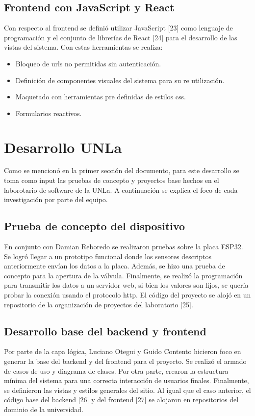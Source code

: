\subsection{Frontend con JavaScript y React}
Con respecto al frontend se definió utilizar JavaScript [23] como lenguaje de programación y el conjunto de librerías de React [24] para el desarrollo de las vistas del sistema. Con estas herramientas se realiza:
\begin{itemize}
\item Bloqueo de urls no permitidas sin autenticación.
\item Definición de componentes visuales del sistema para su re utilización.
\item Maquetado con herramientas pre definidas de estilos css.
\item Formularios reactivos.
\end{itemize}


\section{Desarrollo UNLa}
Como se mencionó en la primer sección del documento, para este desarrollo se toma como input las pruebas de concepto y proyectos base hechos en el laborotario de software de la UNLa. A continuación se explica el foco de cada investigación por parte del equipo.

\subsection{Prueba de concepto del dispositivo}
En conjunto con Damian Reboredo se realizaron pruebas sobre la placa ESP32. Se logró llegar a un prototipo funcional donde los sensores descriptos anteriormente envían los datos a la placa. Además, se hizo una prueba de concepto para la apertura de la válvula. Finalmente, se realizó la programación para transmitir los datos a un servidor web, si bien los valores son fijos, se quería probar la conexión usando el protocolo http. El código del proyecto se alojó en un repositorio de la organización de proyectos del laboratorio [25].

\subsection{Desarrollo base del backend y frontend}
Por parte de la capa lógica, Luciano Otegui y Guido Contento hicieron foco en generar la base del backend y del frontend para el proyecto. Se realizó el armado de casos de uso y diagrama de clases. Por otra parte, crearon la estructura mínima del sistema para una correcta interacción de usuarios finales. Finalmente, se definieron las vistas y estilos generales del sitio. Al igual que el caso anterior, el código base del backend [26] y del frontend [27] se alojaron en repositorios del dominio de la universidad.

